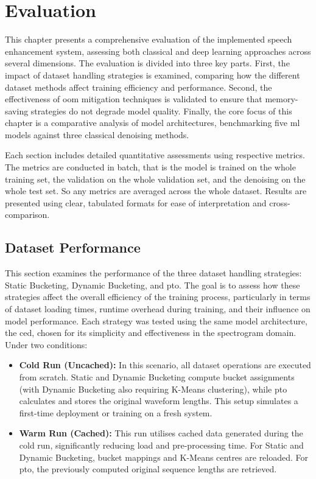 \graphicspath{{content/chapters/7_evaluation/figures/}}
\chapter{Evaluation}
\label{chp:evaluation}

This chapter presents a comprehensive evaluation of the implemented speech enhancement system, assessing both classical and deep learning approaches across several dimensions. The evaluation is divided into three key parts. First, the impact of dataset handling strategies is examined, comparing how the different dataset methods affect training efficiency and performance. Second, the effectiveness of \gls{oom} mitigation techniques is validated to ensure that memory-saving strategies do not degrade model quality. Finally, the core focus of this chapter is a comparative analysis of model architectures, benchmarking five \gls{ml} models against three classical denoising methods.

Each section includes detailed quantitative assessments using respective metrics. The metrics are conducted in batch, that is the model is trained on the whole training set, the validation on the whole validation set, and the denoising on the whole test set. So any metrics are averaged across the whole dataset. Results are presented using clear, tabulated formats for ease of interpretation and cross-comparison.

\section{Dataset Performance}
\label{sec:dataset_performance}

This section examines the performance of the three dataset handling strategies: Static Bucketing, Dynamic Bucketing, and \gls{pto}. The goal is to assess how these strategies affect the overall efficiency of the training process, particularly in terms of dataset loading times, runtime overhead during training, and their influence on model performance. Each strategy was tested using the same model architecture, the \gls{ced}, chosen for its simplicity and effectiveness in the spectrogram domain. Under two conditions:

\begin{itemize}
    \item \textbf{Cold Run (Uncached):} In this scenario, all dataset operations are executed from scratch. Static and Dynamic Bucketing compute bucket assignments (with Dynamic Bucketing also requiring K-Means clustering), while \gls{pto} calculates and stores the original waveform lengths. This setup simulates a first-time deployment or training on a fresh system.
    
    \item \textbf{Warm Run (Cached):} This run utilises cached data generated during the cold run, significantly reducing load and pre-processing time. For Static and Dynamic Bucketing, bucket mappings and K-Means centres are reloaded. For \gls{pto}, the previously computed original sequence lengths are retrieved.
\end{itemize}

